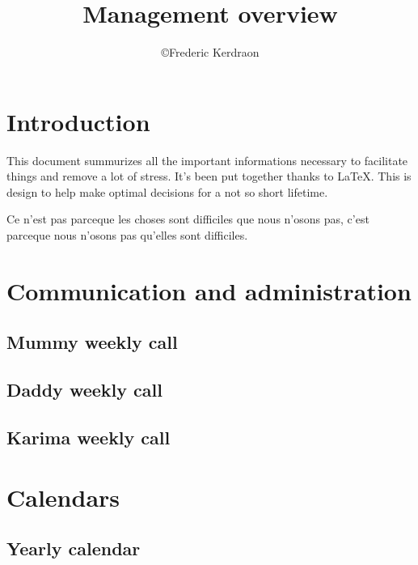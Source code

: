 \documentclass[8pt]{article} %
\title{Management overview}
\author{\copyright Frederic Kerdraon}
\begin{document}
\maketitle
\tableofcontents
\section{Introduction}

This document summurizes all the important informations necessary to facilitate things and remove a lot of stress. It's been put together thanks to \LaTeX. This is design to help make optimal decisions for a not so short lifetime.

Ce n'est pas parceque les choses sont difficiles que nous n'osons pas, c'est parceque nous n'osons pas qu'elles sont difficiles.
\texteuro

\section{Communication and administration}
\subsection{Mummy weekly call}
\subsection{Daddy weekly call}
\subsection{Karima weekly call}

\section{Calendars}
\subsection{Yearly calendar}
\end{document}
